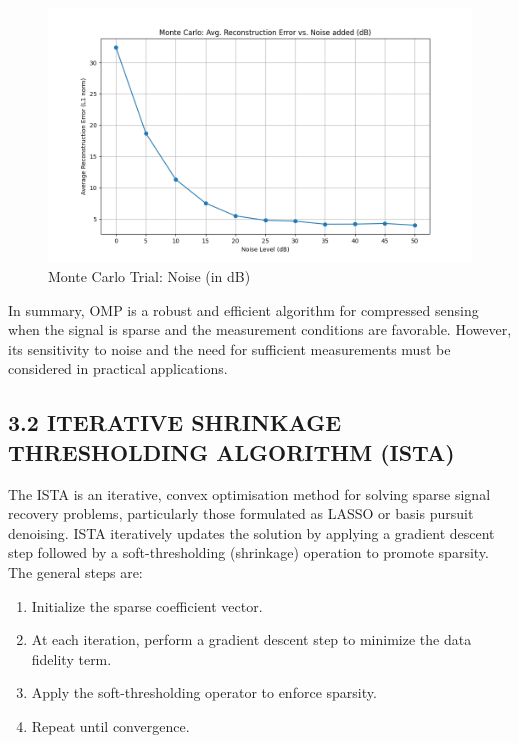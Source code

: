 \documentclass[
  letterpaper,
  DIV=11,
  numbers=noendperiod]{scrartcl}
\providecommand{\tightlist}{%
  \setlength{\itemsep}{0pt}\setlength{\parskip}{0pt}}
\begin{document}
\begin{figure}[H]

{\centering \includegraphics[width=0.8\linewidth,height=\textheight,keepaspectratio]{abar-cs_files/mediabag/omp-montecarlo-noise.png}

}

\caption{Monte Carlo Trial: Noise (in dB)}

\end{figure}%

In summary, OMP is a robust and efficient algorithm for compressed
sensing when the signal is sparse and the measurement conditions are
favorable. However, its sensitivity to noise and the need for sufficient
measurements must be considered in practical applications.

\subsection{3.2 ITERATIVE SHRINKAGE THRESHOLDING ALGORITHM
(ISTA)}\label{iterative-shrinkage-thresholding-algorithm-ista}

The ISTA is an iterative, convex optimisation method for solving sparse
signal recovery problems, particularly those formulated as LASSO or
basis pursuit denoising. ISTA iteratively updates the solution by
applying a gradient descent step followed by a soft-thresholding
(shrinkage) operation to promote sparsity. The general steps are:

\begin{enumerate}
\def\labelenumi{\arabic{enumi}.}
\tightlist
\item
  Initialize the sparse coefficient vector.
\item
  At each iteration, perform a gradient descent step to minimize the
  data fidelity term.
\item
  Apply the soft-thresholding operator to enforce sparsity.
\item
  Repeat until convergence.
\end{enumerate}
\end{document}
